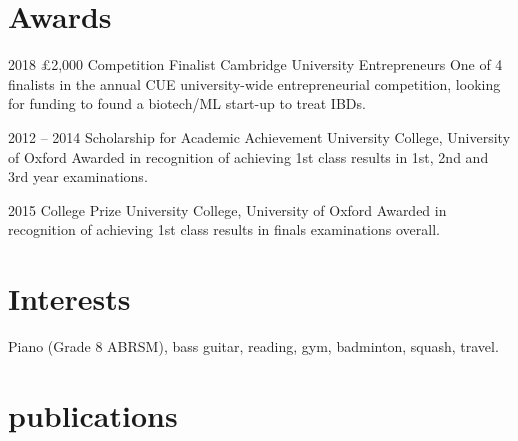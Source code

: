 \documentclass[]{friggeri-cv} %
\begin{document}
\pagebreak
\section{Awards}

\begin{entrylist}
	
    \entrysmall
    {2018}
    {£2,000 Competition Finalist}
    {Cambridge University Entrepreneurs}
    {One of 4 finalists in the annual CUE university-wide entrepreneurial competition, looking for
    funding to found a biotech/ML start-up to treat IBDs.}
    	
	\entrysmall
	{2012 -- 2014}
	{Scholarship {\normalfont for Academic Achievement}}
	{University College, University of Oxford}
	{Awarded in recognition of achieving 1st class results in 1st, 2nd and 3rd year examinations.}
	
	\entrysmall
	{2015}
	{College Prize}
	{University College, University of Oxford}
	{Awarded in recognition of achieving 1st class results in finals examinations overall.}
	
	
\end{entrylist}


\section{Interests}

Piano (Grade 8 ABRSM), bass guitar, reading, gym, badminton, squash, travel.


\iffalse

\section{publications}
\end{document}
